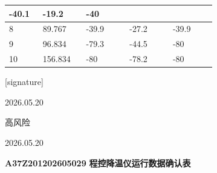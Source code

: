 \documentclass[UTF8,10pt,a4paper,fontset=fandol]{ctexart}
\newcommand{\fieldvalue}[1]{#1}
\newcommand{\handwritten}[1]{#1}
\begin{document}
\begin{center}
\begin{tabular}{|p{0.14\linewidth}|p{0.18\linewidth}|p{0.18\linewidth}|p{0.18\linewidth}|p{0.18\linewidth}|}
\fieldvalue{-40.1} &
\fieldvalue{-19.2} &
\fieldvalue{-40}\\
\hline
8 &
\fieldvalue{89.767} &
\fieldvalue{-39.9} &
\fieldvalue{-27.2} &
\fieldvalue{-39.9}\\
\hline
9 &
\fieldvalue{96.834} &
\fieldvalue{-79.3} &
\fieldvalue{-44.5} &
\fieldvalue{-80}\\
\hline
10 &
\fieldvalue{156.834} &
\fieldvalue{-80} &
\fieldvalue{-78.2} &
\fieldvalue{-80}\\
\hline
\end{tabular}
\end{center}

\vfill

\begin{flushright}
\fieldvalue{\handwritten{[signature]}}

\fieldvalue{\handwritten{2026.05.20}}

\fieldvalue{\handwritten{高风险}}

\fieldvalue{\handwritten{2026.05.20}}
\end{flushright}

\newpage

\begin{center}
\fieldvalue{\textbf{A37Z201202605029}} \quad \textbf{程控降温仪运行数据确认表}
\end{center}
\end{document}
